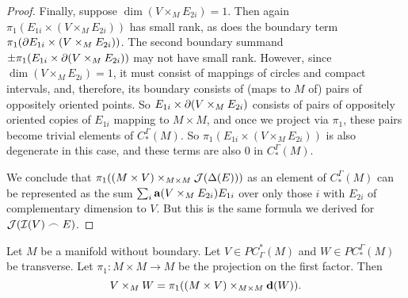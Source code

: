 \begin{proof}
	Finally, suppose $\dim(V \times_M E_{2i}) = 1$.
	Then again $\pi_1(E_{1i} \times (V \times_M E_{2i}))$ has small rank, as does the boundary term $\pi_1(\partial E_{1i} \times (V \times_M E_{2i}))$.
	The second boundary summand $\pm\pi_1(E_{1i} \times \partial(V \times_M E_{2i}))$ may not have small rank.
	However, since $\dim(V \times_M E_{2i}) = 1$, it must consist of mappings of circles and compact intervals, and, therefore, its boundary consists of (maps to $M$ of) pairs of oppositely oriented points.
	So $E_{1i} \times \partial(V \times_M E_{2i})$ consists of pairs of oppositely oriented copies of $E_{1i}$ mapping to $M \times M$, and once we project via $\pi_1$, these pairs become trivial elements of $C^\Gamma_*(M)$.
	So $\pi_1(E_{1i} \times (V \times_M E_{2i}))$ is also degenerate in this case, and these terms are also $0$ in $C^\Gamma_*(M)$.

	\begin{comment}
		We also have
		$$\bd ( V \times_M E_{2i}) = \pm (\bd V) \times_M E_{2i}\pm V \times_M \bd E_{2i}$$.
		Since $V$ is a cocycle, $\bd V$ is a union of trivial or small rank precochains, and hence so is $(\bd V) \times_M E_{2i}$ by Lemma \ref{L: pullback with Q}.
		If $\dim( V \times_M \bd E_{2i})>0$, then $\pi(V \times_M \bd E_{2i})$ has small rank.
		Finally, suppose $\dim (V \times_M \bd E_{2i}) = 0$.
		Then $\dim(V \times_M E_{2i}) = 1$.
		So $V \times_M E_{2i}$ consists of some number of circles and closed intervals in $E_{2i}$, and $V \times_M \bd E_{2i}$ will be the endpoints of those intervals.
		Since these must occur in pairs of opposite signs, then $E_{1i} \times (V \times_M \bd E_{2i})$ will consist of chains $\pm E_{1i} \times pt$, with the points being the points of $V \times_M \bd E_{2i}$.
		Since the points occur in oppositely signed pairs, under $\pi_1$ these pairs become trivial in $M$.
		Altogether then $\pi_1(\bd ( V \times_M E_{2i}))$ is a disjoint union of trivial and small rank precochains.
		So $V \times_M E_{2i} \in Q_*(M)$.
	\end{comment}

	We conclude that $\pi_1( (M \times V)\times_{M \times M}\mathcal{J}(\Delta(E)))$ as an element of $C_*^\Gamma(M)$ can be represented as the sum $\sum_i \mathbf{a}(V \times_M E_{2i})E_{1i}$ over only those $i$ with $E_{2i}$ of complementary dimension to $V$.
	But this is the same formula we derived for $\mathcal{J}(\mathcal{I}(V)\frown E)$.
\end{proof}

\begin{lemma}\label{L: diagonal version of intersection}
	Let $M$ be a manifold without boundary.
	Let $V \in PC^*_\Gamma(M)$ and $W \in PC_*^\Gamma(M)$ be transverse.
	Let $\pi_1 \colon M \times M \to M$ be the projection on the first factor.
	Then $$V \times_M W = \pi_1((M \times V)\times_{M \times M} \mathbf{d}(W)).$$
\end{lemma}

